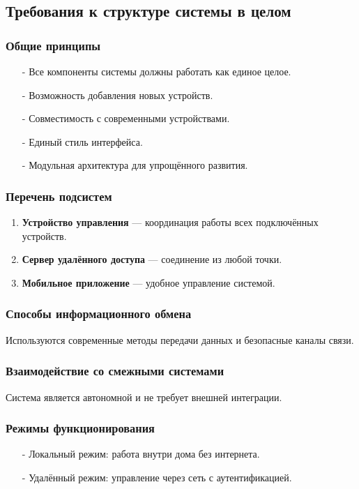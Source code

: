\documentclass[oneside,a4paper,14pt]{extarticle}
\begin{document}
\subsection{Требования к структуре системы в целом}

\subsubsection{Общие принципы}
\begin{itemize}
    \item[-] Все компоненты системы должны работать как единое целое.
    \item[-] Возможность добавления новых устройств.
    \item[-] Совместимость с современными устройствами.
    \item[-] Единый стиль интерфейса.
    \item[-] Модульная архитектура для упрощённого развития.
\end{itemize}

\subsubsection{Перечень подсистем}
\begin{enumerate}
    \item \textbf{Устройство управления} — координация работы всех подключённых устройств.
    \item \textbf{Сервер удалённого доступа} — соединение из любой точки.
    \item \textbf{Мобильное приложение} — удобное управление системой.
\end{enumerate}

\subsubsection{Способы информационного обмена}
Используются современные методы передачи данных и безопасные каналы связи.

\subsubsection{Взаимодействие со смежными системами}
Система является автономной и не требует внешней интеграции.

\subsubsection{Режимы функционирования}
\begin{itemize}
    \item[-] Локальный режим: работа внутри дома без интернета.
    \item[-] Удалённый режим: управление через сеть с аутентификацией.
\end{itemize}
\end{document}
